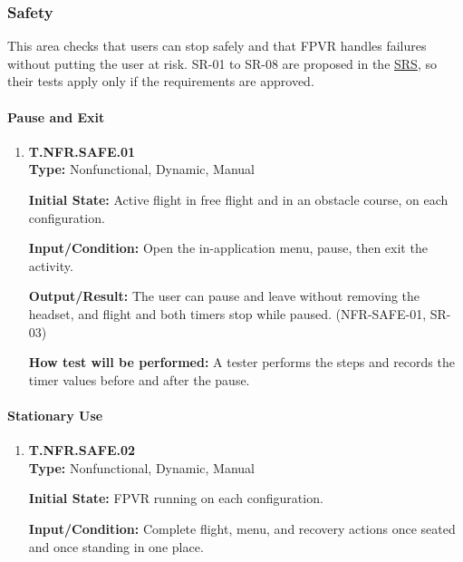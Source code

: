 \documentclass[12pt, titlepage]{article}
\begin{document}
\subsubsection{Safety}

This area checks that users can stop safely and that FPVR handles failures without
putting the user at risk. SR-01 to SR-08 are proposed in the \hyperlink{abbr:SRS}{SRS}, so their tests apply
only if the requirements are approved.

{\sloppy
\paragraph{Pause and Exit}

\begin{enumerate}

\item{\hypertarget{test-nfr-safe-01}{}\textbf{T.NFR.SAFE.01}\\}
\textbf{Type:} Nonfunctional, Dynamic, Manual

\textbf{Initial State:} Active flight in free flight and in an obstacle course, on each
configuration.

\textbf{Input/Condition:} Open the in-application menu, pause, then exit the activity.

\textbf{Output/Result:} The user can pause and leave without removing the headset, and
flight and both timers stop while paused. (\mbox{NFR-SAFE-01}, \mbox{SR-03})

\textbf{How test will be performed:} A tester performs the steps and records the timer
values before and after the pause.

\end{enumerate}

\paragraph{Stationary Use}

\begin{enumerate}

\item{\hypertarget{test-nfr-safe-02}{}\textbf{T.NFR.SAFE.02}\\}
\textbf{Type:} Nonfunctional, Dynamic, Manual

\textbf{Initial State:} FPVR running on each configuration.

\textbf{Input/Condition:} Complete flight, menu, and recovery actions once seated and
once standing in one place.


\end{enumerate}}
\end{document}
